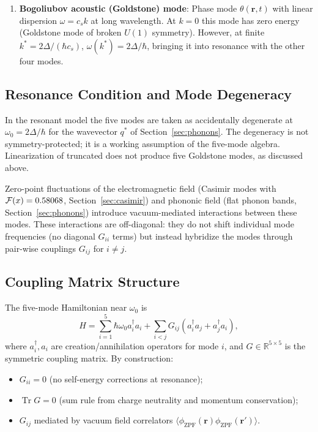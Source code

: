 \documentclass[11pt,letterpaper]{article}
\begin{document}
\begin{enumerate}
    \item \textbf{Bogoliubov acoustic (Goldstone) mode}: Phase mode $\theta(\mathbf{r}, t)$ with linear dispersion $\omega = c_s k$ at long wavelength. At $k=0$ this mode has zero energy (Goldstone mode of broken $U(1)$ symmetry). However, at finite $k^* = 2\Delta/(\hbar c_s)$, $\omega(k^*) = 2\Delta/\hbar$, bringing it into resonance with the other four modes.
\end{enumerate}

\subsection{Resonance Condition and Mode Degeneracy}

In the resonant model the five modes are taken as accidentally degenerate at $\omega_0 = 2\Delta/\hbar$ for the wavevector $q^*$ of Section~\ref{sec:phonons}. The degeneracy is not symmetry-protected; it is a working assumption of the five-mode algebra. Linearization of truncated \TQGL{} does not produce five Goldstone modes, as discussed above.

Zero-point fluctuations of the electromagnetic field (Casimir modes with $\mathcal{F}(x) = 0.58068$, Section~\ref{sec:casimir}) and phononic field (flat phonon bands, Section~\ref{sec:phonons}) introduce vacuum-mediated interactions between these modes. These interactions are off-diagonal: they do not shift individual mode frequencies (no diagonal $G_{ii}$ terms) but instead hybridize the modes through pair-wise couplings $G_{ij}$ for $i \neq j$.

\subsection{Coupling Matrix Structure}

The five-mode Hamiltonian near $\omega_0$ is
\begin{equation}
H = \sum_{i=1}^5 \hbar \omega_0 a_i^\dagger a_i + \sum_{i<j} G_{ij} (a_i^\dagger a_j + a_j^\dagger a_i),
\end{equation}
where $a_i^\dagger, a_i$ are creation/annihilation operators for mode $i$, and $G \in \mathbb{R}^{5 \times 5}$ is the symmetric coupling matrix. By construction:
\begin{itemize}
    \item $G_{ii} = 0$ (no self-energy corrections at resonance);
    \item $\operatorname{Tr} G = 0$ (sum rule from charge neutrality and momentum conservation);
    \item $G_{ij}$ mediated by vacuum field correlators $\langle \phi_{\text{ZPF}}(\mathbf{r}) \phi_{\text{ZPF}}(\mathbf{r}')\rangle$.
\end{itemize}
\end{document}
